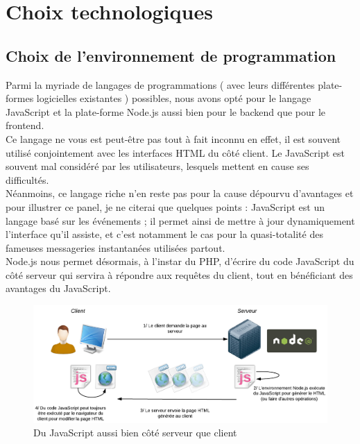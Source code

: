 \section{Choix technologiques}

\subsection*{Choix de l'environnement de programmation}

Parmi la myriade de langages de programmations ( avec leurs différentes plate-formes logicielles existantes ) possibles, nous avons opté pour le langage JavaScript et la plate-forme Node.js aussi bien pour le \Gls{backend} que pour le \Gls{frontend}. \\

Ce langage ne vous est peut-être pas tout à fait inconnu en effet, il est souvent utilisé conjointement avec les interfaces HTML du côté client. Le JavaScript est souvent mal considéré par les utilisateurs, lesquels mettent en cause ses difficultés. \\

Néanmoins, ce langage riche n’en reste pas pour la cause dépourvu d’avantages et pour illustrer ce panel, je ne citerai que quelques points : JavaScript est un langage basé sur les événements ; il permet ainsi de mettre à jour dynamiquement l’interface qu’il assiste, et c’est notamment le cas pour la quasi-totalité des fameuses messageries instantanées utilisées partout.\\

Node.js nous permet désormais, à l'instar du PHP, d'écrire du code JavaScript du côté serveur qui servira à répondre aux requêtes du client, tout en bénéficiant des avantages du JavaScript. \\

\begin{figure}[H]
    \includegraphics[width=\textwidth,height=\textheight,keepaspectratio]{images/SchemaNodejs.png}
    \centering
    \caption[Du JavaScript aussi bien côté serveur que client]{Du JavaScript aussi bien côté serveur que client~\cite{NodejsIllustrations}}
    \label{pic:WhatIsNodeJs}
\end{figure}

